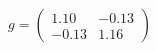 \documentclass[preview]{standalone}
\begin{document}
\begin{align*}
g = \begin{pmatrix} 1.10 & -0.13 \\ -0.13 & 1.16 \end{pmatrix}
\end{align*}
\end{document}
